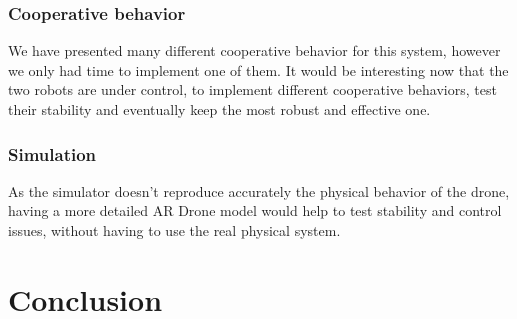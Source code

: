 \documentclass[11pt,a4paper]{article}
\begin{document}
\subsubsection{Cooperative behavior}
We have presented many different cooperative behavior for this system, however we only had time to 
implement one of them. It would be interesting now that the two robots are under control, to implement
different cooperative behaviors, test their stability and eventually keep the most robust and effective
one.

\subsubsection{Simulation}
As the simulator doesn't reproduce accurately the physical behavior of the drone, having a more detailed 
AR Drone model would help to test stability and control issues, without having to use the real physical 
system.

\section{Conclusion}




\end{document}
